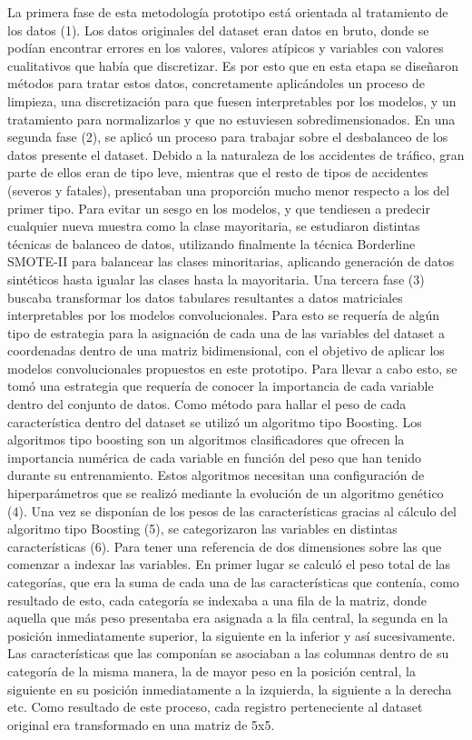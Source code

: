 \documentclass{uathesis-es}
\begin{document}
{	La primera fase de esta metodología prototipo está orientada al tratamiento de los datos (1). Los datos originales del dataset eran datos en bruto, donde se podían encontrar errores en los valores, valores atípicos y variables con valores cualitativos que había que discretizar. Es por esto que en esta etapa se diseñaron métodos para tratar estos datos, concretamente aplicándoles un proceso de limpieza, una discretización para que fuesen interpretables por los modelos, y un tratamiento para normalizarlos y que no estuviesen sobredimensionados. En una segunda fase (2), se aplicó un proceso para trabajar sobre el desbalanceo de los datos presente el dataset. Debido a la naturaleza de los accidentes de tráfico, gran parte de ellos eran de tipo leve, mientras que el resto de tipos de accidentes (severos y fatales), presentaban una proporción mucho menor respecto a los del primer tipo. Para evitar un sesgo en los modelos, y que tendiesen a predecir cualquier nueva muestra como la clase mayoritaria, se estudiaron distintas técnicas de balanceo de datos, utilizando finalmente la técnica Borderline SMOTE-II para balancear las clases minoritarias, aplicando generación de datos sintéticos hasta igualar las clases hasta la mayoritaria. Una tercera fase (3) buscaba transformar los datos tabulares resultantes a datos matriciales interpretables por los modelos convolucionales. Para esto se requería de algún tipo de estrategia para la asignación de cada una de las variables del dataset a coordenadas dentro de una matriz bidimensional, con el objetivo de aplicar los modelos convolucionales propuestos en este prototipo. Para llevar a cabo esto, se tomó una estrategia que requería de conocer la importancia de cada variable dentro del conjunto de datos. Como método para hallar el peso de cada característica dentro del dataset se utilizó un algoritmo tipo Boosting. Los algoritmos tipo boosting son un algoritmos clasificadores que ofrecen la importancia numérica de cada variable en función del peso que han tenido durante su entrenamiento. Estos algoritmos necesitan una configuración de hiperparámetros que se realizó mediante la evolución de un algoritmo genético (4). Una vez se disponían de los pesos de las características gracias al cálculo del algoritmo tipo Boosting (5), se categorizaron las variables en distintas características (6). Para tener una referencia de dos dimensiones sobre las que comenzar a indexar las variables. En primer lugar se calculó el peso total de las categorías, que era la suma de cada una de las características que contenía, como resultado de esto, cada categoría se indexaba a una fila de la matriz, donde aquella que más peso presentaba era asignada a la fila central, la segunda en la posición inmediatamente superior, la siguiente en la inferior y así sucesivamente. Las características que las componían se asociaban a las columnas dentro de su categoría de la misma manera, la de mayor peso en la posición central, la siguiente en su posición inmediatamente a la izquierda, la siguiente a la derecha etc. Como resultado de este proceso, cada registro perteneciente al dataset original era transformado en una matriz de 5x5.
	
}
\end{document}
